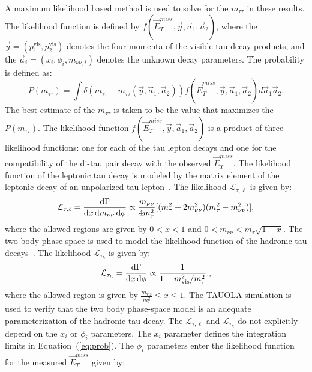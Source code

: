 A maximum likelihood based method is used to solve for the $m_{\tau\tau}$ in these results. The likelihood function is defined by $f(\vec{E}_T^{miss},\vec{y},\vec{a}_1,\vec{a}_2)$, where the $\vec{y}=(p_1^{\mathrm{vis}},p_2^{\mathrm{vis}})$ denotes the four-momenta of the visible tau decay products, and the $\vec{a}_i=(x_i,\phi_i,m_{\nu\nu,i})$ denotes the unknown decay parameters. The probability is defined as:
\begin{equation} \label{eq:prob}
P(m_{\tau\tau}) = \int \delta(m_{\tau\tau}-m_{\tau\tau}(\vec{y},\vec{a}_1,\vec{a}_2)) f(\vec{E}_T^{miss}, \vec{y},\vec{a}_1,\vec{a}_2)d\vec{a}_1\vec{a}_2.
\end{equation}
The best estimate of the $m_{\tau\tau}$ is taken to be the value that maximizes the $P(m_{\tau\tau})$. The likelihood function $f(\vec{E}_T^{miss},\vec{y},\vec{a}_1,\vec{a}_2)$ is a product of three likelihood functions: one for each of the tau lepton decays and one for the compatibility of the di-tau pair decay with the observed $\vec{E}_T^{miss}$. The likelihood function of the leptonic tau decay is modeled by the matrix element of the leptonic decay of an unpolarized tau lepton~\cite{TauPol}. The likelihood $\mathcal{L}_{\tau,\ell}$ is given by:     
\begin{equation} 
\mathcal{L}_{\tau,\ell} = \frac{{\rm d}\Gamma}{{\rm d}x\,{\rm d}m_{\nu\nu}\,{\rm d}\phi} \propto \frac{m_{\nu\nu}}{4m_{\tau}^2} [(m_{\tau}^2 +2m_{\nu\nu}^2 )(m_{\tau}^2 - m_{\nu\nu}^2)],
\label{eq:likelihoodLepTauDecay}
\end{equation}
where the allowed regions are given by $0<x<1$ and $0<m_{\nu\nu}<m_{\tau}\sqrt{1-x}$. The two body phase-space is used to model the likelihood function of the hadronic tau decays~\cite{Agashe:2014kda}. The likelihood  $\mathcal{L}_{\tau_{h}}$ is given by:
\begin{equation}
\mathcal{L}_{\tau_{h}} = \frac{{\rm d}\Gamma}{{\rm d}x\,{\rm d}\phi} \propto \frac{1}{1- m^2_{\rm vis}/m^2_{\tau}}.,
\label{eq:likelihoodHadTauDecay}
\end{equation}
where the allowed region is given by $\frac{m_{\mathrm{vis}}}{m_{\tau}^2}\leq x \leq 1$. The TAUOLA simulation is used to verify that the two body phase-space model is an adequate parameterization of the hadronic tau decay. The $\mathcal{L}_{\tau,\ell}$  and $\mathcal{L}_{\tau_{h}}$  do not explicitly depend on the $x_i$ or $\phi_i$ parameters. The $x_i$ parameter defines the integration limits in Equation~(\ref{eq:prob}). The $\phi_i$ parameters enter the likelihood function for the measured $\vec{E}_{T}^{miss}$ given by:
